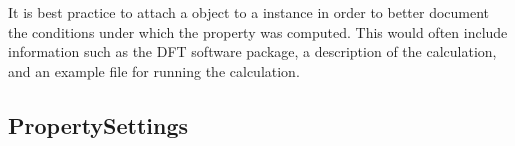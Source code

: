 \documentclass[letterpaper,10pt,english]{sphinxmanual}
\begin{document}
\label{\detokenize{property_settings:module-colabfit.tools.property_settings}}
\sphinxAtStartPar
It is best practice to attach a {\hyperref[\detokenize{property_settings:colabfit.tools.property_settings.PropertySettings}]{}} object to a
{\hyperref[\detokenize{property:colabfit.tools.property.Property}]{}} instance in order to better document
the conditions under which the property was computed. This would often include
information such as the DFT software package, a description of the calculation,
and an example file for running the calculation.


\subsection{PropertySettings}
\label{\detokenize{property_settings:propertysettings}}\label{\detokenize{property_settings::doc}}
\end{document}
